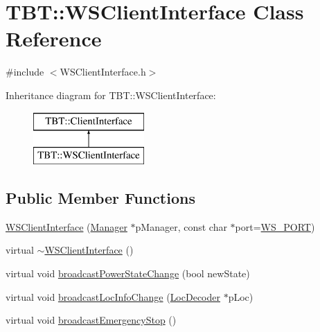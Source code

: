 \hypertarget{classTBT_1_1WSClientInterface}{}\section{T\+BT\+:\+:W\+S\+Client\+Interface Class Reference}
\label{classTBT_1_1WSClientInterface}


{\ttfamily \#include $<$W\+S\+Client\+Interface.\+h$>$}

Inheritance diagram for T\+BT\+:\+:W\+S\+Client\+Interface\+:\begin{figure}[H]
\begin{center}
\leavevmode
\includegraphics[height=2.000000cm]{classTBT_1_1WSClientInterface}
\end{center}
\end{figure}
\subsection*{Public Member Functions}
\begin{DoxyCompactItemize}
\item 
\hyperlink{classTBT_1_1WSClientInterface_addd44890c3c54a9700a2385a63105e38_addd44890c3c54a9700a2385a63105e38}{W\+S\+Client\+Interface} (\hyperlink{classTBT_1_1Manager}{Manager} $\ast$p\+Manager, const char $\ast$port=\hyperlink{WSClientInterface_8h_afe65cb51ee32f3e2bb3bf811958d49f2_afe65cb51ee32f3e2bb3bf811958d49f2}{W\+S\+\_\+\+P\+O\+RT})
\item 
virtual \hyperlink{classTBT_1_1WSClientInterface_a4b9ee6b21999c47c2cd3f58f8575297c_a4b9ee6b21999c47c2cd3f58f8575297c}{$\sim$\+W\+S\+Client\+Interface} ()
\item 
virtual void \hyperlink{classTBT_1_1WSClientInterface_ad1c7f413c63f04b04d6e20f5d154d1fd_ad1c7f413c63f04b04d6e20f5d154d1fd}{broadcast\+Power\+State\+Change} (bool new\+State)
\item 
virtual void \hyperlink{classTBT_1_1WSClientInterface_a39806206461815c06c517b66d122b4db_a39806206461815c06c517b66d122b4db}{broadcast\+Loc\+Info\+Change} (\hyperlink{classTBT_1_1LocDecoder}{Loc\+Decoder} $\ast$p\+Loc)
\item 
virtual void \hyperlink{classTBT_1_1WSClientInterface_a2ad439e557711c57c8a978e3b6efcb62_a2ad439e557711c57c8a978e3b6efcb62}{broadcast\+Emergency\+Stop} ()
\end{DoxyCompactItemize}
